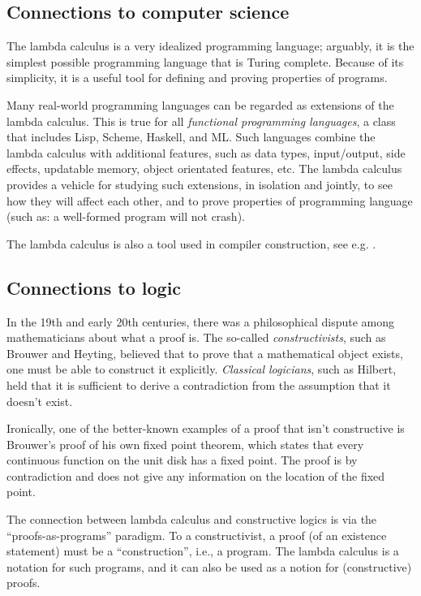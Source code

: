 \documentclass[12pt]{article}
\begin{document}
\subsection{Connections to computer science}

The lambda calculus is a very idealized programming language;
arguably, it is the simplest possible programming language that is
Turing complete. Because of its simplicity, it is a useful tool for
defining and proving properties of programs.

Many real-world programming languages can be regarded as extensions of
the lambda calculus. This is true for all {\em functional programming
  languages}, a class that includes Lisp, Scheme, Haskell, and ML.
Such languages combine the lambda calculus with additional features,
such as data types, input/output, side effects, updatable memory,
object orientated features, etc. The lambda calculus provides a
vehicle for studying such extensions, in isolation and jointly, to see
how they will affect each other, and to prove properties of
programming language (such as: a well-formed program will not crash).

The lambda calculus is also a tool used in compiler construction, see
e.g. \cite{Pey87,App92}.

\subsection{Connections to logic}

In the 19th and early 20th centuries, there was a philosophical
dispute among mathematicians about what a proof is. The so-called {\em
  constructivists}, such as Brouwer and Heyting, believed that to prove
that a mathematical object exists, one must be able to construct it
explicitly. {\em Classical logicians}, such as Hilbert, held that it
is sufficient to derive a contradiction from the assumption that it
doesn't exist.

Ironically, one of the better-known examples of a proof that isn't
constructive is Brouwer's proof of his own fixed point theorem,
which states that every continuous function on the unit disk has a
fixed point. The proof is by contradiction and does not give any
information on the location of the fixed point.

The connection between lambda calculus and constructive logics is via
the ``proofs-as-programs'' paradigm. To a constructivist, a proof (of
an existence statement) must be a ``construction'', i.e., a program.
The lambda calculus is a notation for such programs, and it can also
be used as a notion for (constructive) proofs.
\end{document}
